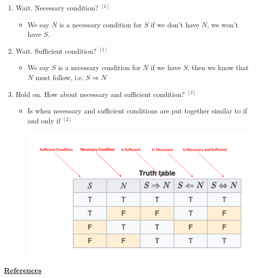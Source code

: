 \documentclass[12pt]{article}
\begin{document}
\begin{itemize}
\begin{mdframed}
        \begin{enumerate}
            \item Wait. Necessary condition? $^{[1]}$
            \begin{itemize}
                \item We say $N$ is a necessary condition for $S$ if we don't have $N$,
                we won't have $S$.
            \end{itemize}
            \item Wait. Sufficient condition? $^{[1]}$
            \begin{itemize}
                \item We say $S$ is a necessary condition for $N$ if we have $S$,
                then we know that $N$ must follow, i.e. $S \Rightarrow N$
            \end{itemize}
            \item Hold on. How about necessary and sufficient condition? $^{[2]}$
            \begin{itemize}
                \item Is when necessary and sufficient conditions are put together
                similar to if and only if $^{[2]}$

                \begin{center}
                    \includegraphics[width=0.8\linewidth]{images/week_10_notes_1_2.png}
                \end{center}
            \end{itemize}
        \end{enumerate}

    \end{mdframed}

    \bigskip

    \underline{\textbf{References}}

    \bigskip


\end{itemize}
\end{document}

